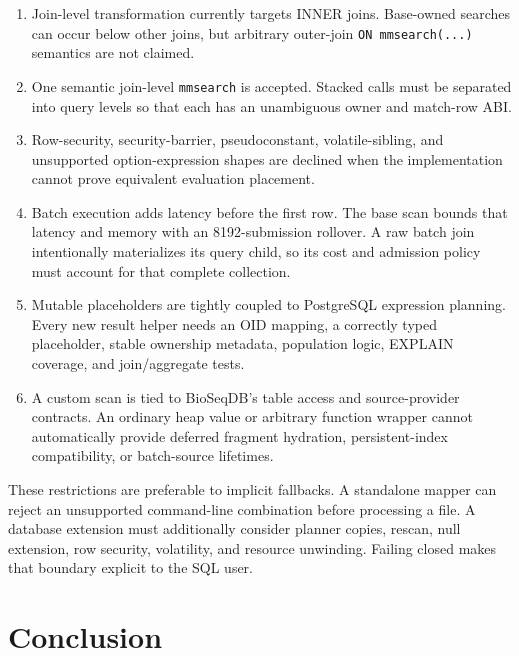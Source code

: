 \begin{enumerate}
  \item Join-level transformation currently targets INNER joins.  Base-owned
  searches can occur below other joins, but arbitrary outer-join
  \texttt{ON mmsearch(...)} semantics are not claimed.

  \item One semantic join-level \texttt{mmsearch} is accepted.  Stacked calls
  must be separated into query levels so that each has an unambiguous owner
  and match-row ABI.

  \item Row-security, security-barrier, pseudoconstant, volatile-sibling, and
  unsupported option-expression shapes are declined when the implementation
  cannot prove equivalent evaluation placement.

  \item Batch execution adds latency before the first row.  The base scan
  bounds that latency and memory with an 8192-submission rollover.  A raw
  batch join intentionally materializes its query child, so its cost and
  admission policy must account for that complete collection.

  \item Mutable placeholders are tightly coupled to PostgreSQL expression
  planning.  Every new result helper needs an OID mapping, a correctly typed
  placeholder, stable ownership metadata, population logic, EXPLAIN
  coverage, and join/aggregate tests.

  \item A custom scan is tied to BioSeqDB's table access and source-provider
  contracts.  An ordinary heap value or arbitrary function wrapper cannot
  automatically provide deferred fragment hydration, persistent-index
  compatibility, or batch-source lifetimes.
\end{enumerate}

These restrictions are preferable to implicit fallbacks.  A standalone
mapper can reject an unsupported command-line combination before processing
a file.  A database extension must additionally consider planner copies,
rescan, null extension, row security, volatility, and resource unwinding.
Failing closed makes that boundary explicit to the SQL user.

\section{Conclusion}
\label{sec:customscan-conclusion}

